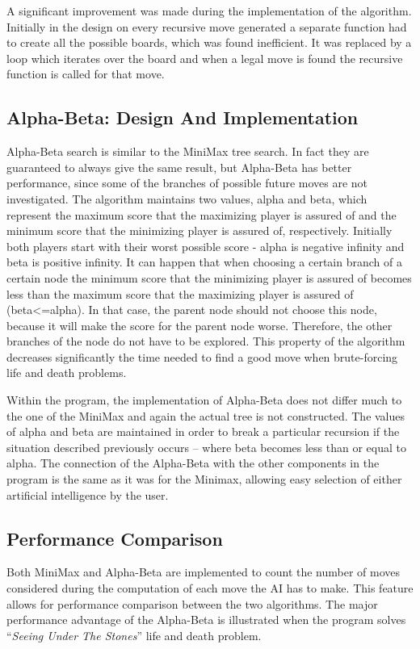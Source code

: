 \documentclass{l3proj}
\begin{document}
A significant improvement was made during the implementation of the algorithm. Initially in the design on every recursive move generated a separate function had to create all the possible boards, which was found inefficient. It was replaced by a loop which iterates over the board and when a legal move is found the recursive function is called for that move.

\subsection{Alpha-Beta: Design And Implementation}

Alpha-Beta search is similar to the MiniMax tree search. In fact they are guaranteed to always give the same result, but Alpha-Beta has better performance, since some of the branches of possible future moves are not investigated. The algorithm maintains two values, alpha and beta, which represent the maximum score that the maximizing player is assured of and the minimum score that the minimizing player is assured of, respectively. Initially both players start with their worst possible score - alpha is negative infinity and beta is positive infinity. It can happen that when choosing a certain branch of a certain node the minimum score that the minimizing player is assured of becomes less than the maximum score that the maximizing player is assured of (beta<=alpha). In that case, the parent node should not choose this node, because it will make the score for the parent node worse. Therefore, the other branches of the node do not have to be explored. This property of the algorithm decreases significantly the time needed to find a good move when brute-forcing life and death problems.

Within the program, the implementation of Alpha-Beta does not differ much to the one of the MiniMax and again the actual tree is not constructed. The values of alpha and beta are maintained in order to break a particular recursion if the situation described previously occurs – where beta becomes less than or equal to alpha. The connection of the Alpha-Beta with the other components in the program is the same as it was for the Minimax, allowing easy selection of either artificial intelligence by the user.

\subsection{Performance Comparison}

Both MiniMax and Alpha-Beta are implemented to count the number of moves considered during the computation of each move the AI has to make. This feature allows for performance comparison between the two algorithms. The major performance advantage of the Alpha-Beta is illustrated when the program solves “\textit{Seeing Under The Stones}” life and death problem.
\end{document}
